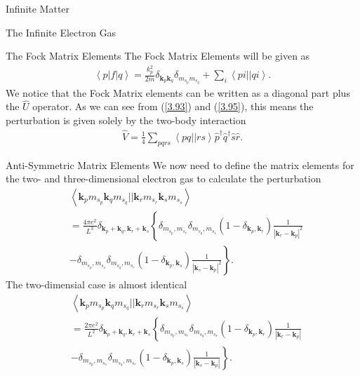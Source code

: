 \documentclass[twoside,english]{uiofysmaster}
\begin{document}
\begin{chapter}{Infinite Matter}
\begin{section}{The Infinite Electron Gas}
		\begin{subsection}{The Fock Matrix Elements}
			The Fock Matrix Elements will be given as
			\begin{align}
				\left< p | f | q \right> = \frac{k_p^2}{2m} \delta_{\mathbf{k}_p \mathbf{k}_q} \delta_{m_{s_p} m_{s_q}} + \sum_i \left<pi||qi\right>.
			\end{align}
			We notice that the Fock Matrix elements can be written as a diagonal part plus the $\hat U$ operator. As we can see from (\ref{3.93}) and (\ref{3.95}), this means the perturbation is given solely by the two-body interaction
			\begin{align}
				\hat V = \frac{1}{4} \sum_{pqrs} \left<pq||rs\right> \hat p^\dagger \hat q^\dagger \hat s \hat r.
			\end{align}
		\end{subsection}

		\begin{subsection}{Anti-Symmetric Matrix Elements}
			We now need to define the matrix elements for the two- and three-dimensional electron gas to calculate the perturbation 
			\begin{align}
				&\left< \mathbf{k}_p m_{s_p} \mathbf{k}_q m_{s_q} || \mathbf{k}_r m_{s_r} \mathbf{k}_s m_{s_s} \right> \\
				&= \frac{4 \pi e^2}{L^3} \delta_{\mathbf{k}_p + \mathbf{k}_q, \mathbf{k}_r + \mathbf{k}_s} \left\{ \delta_{ m_{s_p},m_{s_r} } \delta_{ m_{s_q},m_{s_s} } (1 - \delta_{\mathbf{k}_p, \mathbf{k}_r}) \frac{1}{| \mathbf{k}_r - \mathbf{k}_p|^2} \right. \nonumber \\
				& - \delta_{ m_{s_p},m_{s_s} } \delta_{ m_{s_q},m_{s_r} } (1 - \delta_{\mathbf{k}_p, \mathbf{k}_s}) \left. \frac{1}{| \mathbf{k}_s - \mathbf{k}_p|^2}  \right\}. \nonumber
			\end{align}
			The two-dimensial case is almost identical
			\begin{align}
				&\left< \mathbf{k}_p m_{s_p} \mathbf{k}_q m_{s_q} || \mathbf{k}_r m_{s_r} \mathbf{k}_s m_{s_s} \right> \\
				&= \frac{2 \pi e^2}{L^2} \delta_{\mathbf{k}_p + \mathbf{k}_q, \mathbf{k}_r + \mathbf{k}_s} \left\{ \delta_{ m_{s_p},m_{s_r} } \delta_{ m_{s_q},m_{s_s} } (1 - \delta_{\mathbf{k}_p, \mathbf{k}_r}) \frac{1}{| \mathbf{k}_r - \mathbf{k}_p|} \right. \nonumber \\
				& - \delta_{ m_{s_p},m_{s_s} } \delta_{ m_{s_q},m_{s_r} } (1 - \delta_{\mathbf{k}_p, \mathbf{k}_s}) \left. \frac{1}{| \mathbf{k}_s - \mathbf{k}_p|}  \right\}. \nonumber
			\end{align}		
		\end{subsection}


\end{section}
\end{chapter}
\end{document}

